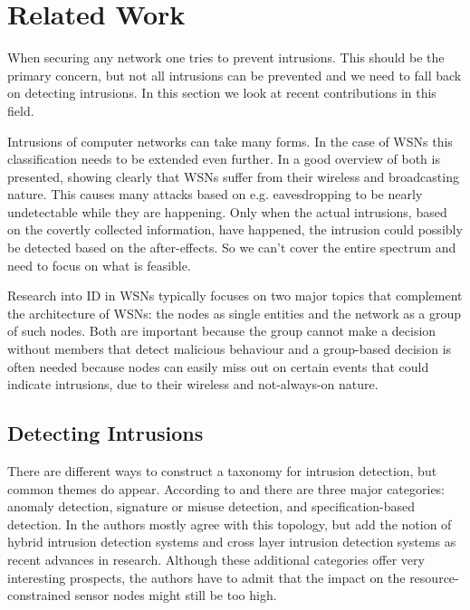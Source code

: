\documentclass[conference]{IEEEtran}
\begin{document}
\section{Related Work}
\label{section:related}

When securing any network one tries to prevent intrusions. This should be the
primary concern, but not all intrusions can be prevented and we need to fall
back on detecting intrusions. In this section we look at recent contributions
in this field.

Intrusions of computer networks can take many forms. In the case of WSNs this
classification needs to be extended even further. In
\cite{padmavathi2009survey} a good overview of both is presented, showing
clearly that WSNs suffer from their wireless and broadcasting nature. This
causes many attacks based on e.g. eavesdropping to be nearly undetectable while
they are happening. Only when the actual intrusions, based on the covertly
collected information, have happened, the intrusion could possibly be detected
based on the after-effects. So we can't cover the entire spectrum and need to
focus on what is feasible.

Research into ID in WSNs typically focuses on two major topics that complement
the architecture of WSNs: the nodes as single entities and the network as a
group of such nodes. Both are important because the group cannot make a
decision without members that detect malicious behaviour and a group-based
decision is often needed because nodes can easily miss out on certain events
that could indicate intrusions, due to their wireless and not-always-on nature.

\subsection{Detecting Intrusions}
\label{subsection:detecting}

There are different ways to construct a taxonomy for intrusion detection, but
common themes do appear. According to \cite{mishra2004intrusion} and
\cite{ioannis2007towards} there are three major categories: anomaly detection,
signature or misuse detection, and specification-based detection. In
\cite{alrajeh2013intrusion} the authors mostly agree with this topology, but
add the notion of hybrid intrusion detection systems and cross layer intrusion
detection systems as recent advances in research. Although these additional
categories offer very interesting prospects, the authors have to admit that the
impact on the resource-constrained sensor nodes might still be too high.
\end{document}
